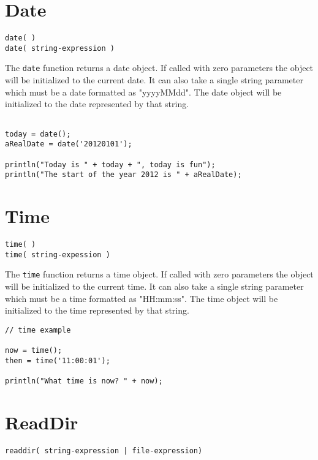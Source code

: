 \section{Date}

\begin{Verbatim}
date( )
date( string-expression )
\end{Verbatim}

The \Verb+date+ function returns a date object. If called with zero parameters the object will be initialized to the current date. It can also take a single string parameter which must be a date formatted as "yyyyMMdd". The date object will be initialized to the date represented by that string.

\begin{lstlisting}[caption={Date example}]

today = date();
aRealDate = date('20120101');

println("Today is " + today + ", today is fun");
println("The start of the year 2012 is " + aRealDate);

\end{lstlisting}

\section{Time}

\begin{Verbatim}
time( )
time( string-expession )
\end{Verbatim}

The \Verb+time+ function returns a time object. If called with zero parameters the object will be initialized to the current time. It can also take a single string parameter which must be a time formatted as "HH:mm:ss". The time object will be initialized to the time represented by that string.

\begin{lstlisting}[caption={Time example}]
// time example

now = time();
then = time('11:00:01');

println("What time is now? " + now);

\end{lstlisting}

\section{ReadDir}

\begin{Verbatim}
readdir( string-expression | file-expression)
\end{Verbatim}

